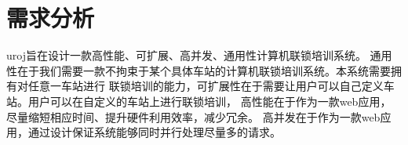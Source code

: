\section{需求分析}
uroj旨在设计一款高性能、可扩展、高并发、通用性计算机联锁培训系统。
通用性在于我们需要一款不拘束于某个具体车站的计算机联锁培训系统。本系统需要拥有对任意一车站进行
联锁培训的能力，可扩展性在于需要让用户可以自己定义车站。用户可以在自定义的车站上进行联锁培训，
高性能在于作为一款web应用，尽量缩短相应时间、提升硬件利用效率，减少冗余。
高并发在于作为一款web应用，通过设计保证系统能够同时并行处理尽量多的请求。